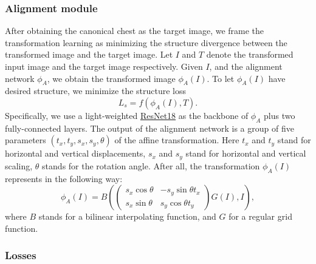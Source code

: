 \documentclass{article}
\begin{document}
\subsubsection{Alignment module}
After obtaining the canonical chest as the target image, we frame the transformation
 learning as minimizing the structure divergence between the transformed image and
 the target image. Let $ I $ and $ T $ denote the transformed input image and the 
 target image respectively. Given $ I $, and the alignment network $ \phi_A $, we 
 obtain the transformed image $ \phi_A(I) $. To let $ \phi_A(I) $ have desired 
 structure, we minimize the structure loss 
\begin{equation}
    L_s = f(\phi_A(I), T).
\end{equation}
Specifically, we use a light-weighted \href{https://pytorch.org/vision/master/models/generated/torchvision.models.resnet18.html#torchvision.models.resnet18}{ResNet18} 
 as the backbone of $\phi_A$ plus two fully-connected layers. The output of the alignment network is a group of five 
 parameters $(t_x, t_y, s_x, s_y, \theta)$ of the affine transformation. Here $t_x$ 
 and $t_y$  stand for horizontal and vertical displacements, $s_x$ and $s_y$ stand 
 for horizontal and vertical scaling, $\theta$ stands for the rotation angle. After 
 all, the transformation $\phi_A(I)$ represents in the following way:
\begin{equation}
    \phi_A(I) = B \left(
    \begin{pmatrix}
        s_x \cos \theta & -s_y \sin \theta t_x \\
        s_x \sin \theta & s_y \cos \theta t_y 
    \end{pmatrix} 
    G(I) , I \right),
\end{equation}
where $ B $ stands for a bilinear interpolating function, and $ G $ for a regular 
 grid function.

\subsubsection{Losses}
\end{document}

